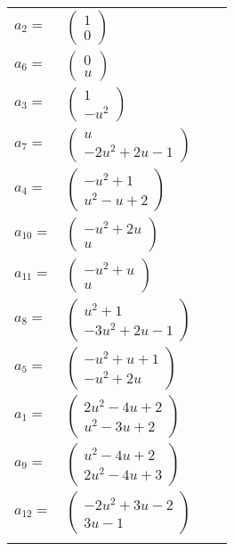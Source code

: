 \documentclass[1p]{elsarticle_modified}
\theoremstyle{definition}
\begin{document}
\begin{tabular}{m{7pt} m{180pt} m{7pt} m{180pt} }
\flushright $a_{2}=$&$\begin{pmatrix}1\\0\end{pmatrix}$ \\
\flushright $a_{6}=$&$\begin{pmatrix}0\\u\end{pmatrix}$ \\
\flushright $a_{3}=$&$\begin{pmatrix}1\\- u^2\end{pmatrix}$ \\
\flushright $a_{7}=$&$\begin{pmatrix}u\\-2 u^2+2 u-1\end{pmatrix}$ \\
\flushright $a_{4}=$&$\begin{pmatrix}- u^2+1\\u^2- u+2\end{pmatrix}$ \\
\flushright $a_{10}=$&$\begin{pmatrix}- u^2+2 u\\u\end{pmatrix}$ \\
\flushright $a_{11}=$&$\begin{pmatrix}- u^2+u\\u\end{pmatrix}$ \\
\flushright $a_{8}=$&$\begin{pmatrix}u^2+1\\-3 u^2+2 u-1\end{pmatrix}$ \\
\flushright $a_{5}=$&$\begin{pmatrix}- u^2+u+1\\- u^2+2 u\end{pmatrix}$ \\
\flushright $a_{1}=$&$\begin{pmatrix}2 u^2-4 u+2\\u^2-3 u+2\end{pmatrix}$ \\
\flushright $a_{9}=$&$\begin{pmatrix}u^2-4 u+2\\2 u^2-4 u+3\end{pmatrix}$ \\
\flushright $a_{12}=$&$\begin{pmatrix}-2 u^2+3 u-2\\3 u-1\end{pmatrix}$\\&\end{tabular}
\end{document}
